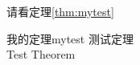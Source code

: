 \documentclass{ctexbook}
\begin{document}
请看定理\ref{thm:mytest}

\begin{theorem}{我的定理}{mytest}
测试定理 \\
Test Theorem
\end{theorem}
\end{document}
